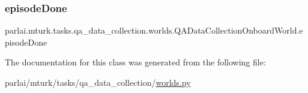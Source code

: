 \subsubsection{\texorpdfstring{episode\+Done}{episodeDone}}
{\footnotesize\ttfamily parlai.\+mturk.\+tasks.\+qa\+\_\+data\+\_\+collection.\+worlds.\+Q\+A\+Data\+Collection\+Onboard\+World.\+episode\+Done}



The documentation for this class was generated from the following file\+:\begin{DoxyCompactItemize}
\item 
parlai/mturk/tasks/qa\+\_\+data\+\_\+collection/\hyperlink{parlai_2mturk_2tasks_2qa__data__collection_2worlds_8py}{worlds.\+py}\end{DoxyCompactItemize}
